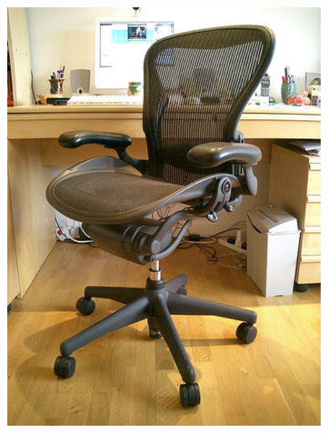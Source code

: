 \begin{figure}[H]
    \centering
    \begin{subfigure}[b]{0.2\textwidth}
        \center
        \includegraphics[width=\textwidth]{Figs/Problem/chair1.jpeg}
        \caption{}
    \end{subfigure}
    \begin{subfigure}[b]{0.2\textwidth}
        \center

\end{subfigure}
\end{figure}
